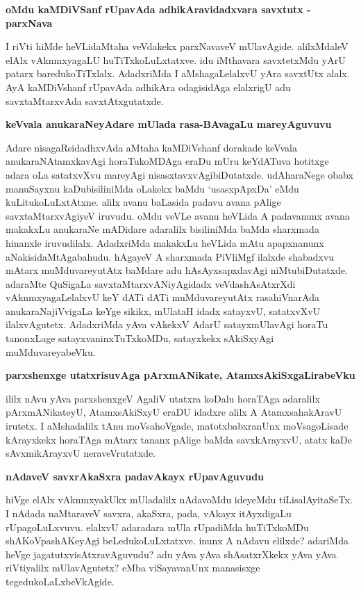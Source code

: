 {\bigskip
\noindent
{\large\bf oMdu kaMDiVSanf rUpavAda adhikAravidadxvara savxtutx - parxNava}}\label{page140}
\medskip

\noindent
I riVti hiMde heVLidaMtaha veVdakekx parxNavaveV mUlavAgide. alilxMdaleV elAlx vAknmxyagaLU huTiTxkoLuLxtatxve. idu iMthavara savxtetxMdu yArU patarx baredukoTiTxlalx. AdadxriMda I aMshagaLelalxvU yAra savxtUtx alalx. AyA kaMDiVshanf rUpavAda adhikAra odagisidAga elalxrigU adu savxtaMtarxvAda savxtAtxgutatxde.

{\bigskip
\noindent
{\large\bf keVvala anukaraNeyAdare mUlada rasa-BAvagaLu mareyAguvuvu}}\label{page141}
\medskip

\noindent
Adare nisagaRsidadhxvAda aMtaha kaMDiVshanf dorakade keVvala anukaraNAtamxkavAgi horaTukoMDAga eraDu mUru keYdATuva hotitxge adara oLa satatxvXvu mareyAgi nisasxtavxvAgibiDutatxde. udAhara\-Nege obabx manuSayxnu kaDubisiliniMda oLakekx baMdu `usasxpApxDa' eMdu kuLitukoLuLxtAtxne. alilx avanu baLa\-sida padavu avana pAlige savxtaMtarxvAgiyeV iruvudu. oMdu veVLe avanu heVLida A pada\-vanunx avana makakxLu anukaraNe mADidare adaralilx bisiliniMda baMda sharxmada hinanxle iruvudilalx. AdadxriMda makakxLu heVLida mAtu apapxnanunx aNakisidaMtAgabahudu. hAgayeV A sharxmada PiVliMgf ilalxde shabadxvu\- mAtarx muMduvareyutAtx baMdare adu hAsAyxsapxdavAgi niMtubiDutatxde. adaraMte QuSigaLa savxtaMtarxvANi\-yAgidadx veVdashAsAtxrXdi vAknmxyagaLelalxvU keY dATi dATi muMduvareyutAtx rasahiVnarAda anukaraNa\-jiVvigaLa keYge sikikx, mUlataH idadx satayxvU, satatxvXvU ilalxvAgutetx. AdadxriMda yAva vAkekxV AdarU satayxmUla\-vAgi horaTu tanonxLage satayxvaninxTuTxkoMDu, satayxkekx sAkiSxyAgi muMduvareyabeVku.

{\bigskip
\noindent
{\large\bf parxshenxge utatxrisuvAga pArxmANikate, AtamxsAkiSxgaLirabeVku}}\label{page141}
\medskip

\noindent
ililx nAvu yAva parxshenxgeV AgaliV utatxra koDalu horaTAga adaralilx pArxmANikateyU, Atamx\-sAkiSxyU eraDU idadxre alilx A AtamxsahakAravU irutetx. I aMshadalilx tAnu moVsahoVgade, matotx\-babxranUnx moVsagoLisade kArayxkekx horaTAga mAtarx tananx pAlige baMda savxkArayxvU, atatx kaDe sAvxmi\-kArayxvU neraveVrutatxde.

{\bigskip
\noindent
{\large\bf nAdaveV savxrAkaSxra padavAkayx rUpavAguvudu}}\label{page141}
\medskip

\noindent
hiVge elAlx vAknmxyakUkx mUladalilx nAdavoMdu ideyeMdu tiLisalAyitaSeTx. I nAdada naMta\-raveV savxra, akaSxra, pada, vAkayx itAyxdigaLu rUpagoLuLxvuvu. elalxvU adaradara mUla rUpa\-diMda huTiTxkoMDu shAKoVpashAKeyAgi beLedukoLuLxtatxve. inunx A nAdavu elilxde? adariMda heVge jagatutx\-visAtxravAguvudu? adu yAva yAva shAsatxrXkekx yAva yAva riVtiyalilx mUlavAgutetx? eMba viSayavanUnx manasisxge tegedukoLaLxbeVkAgide.

